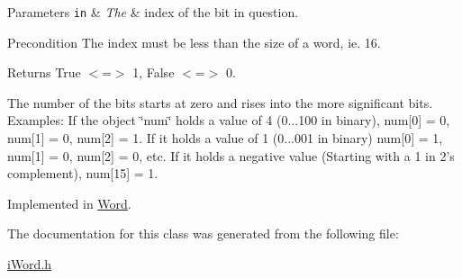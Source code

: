 \begin{DoxyParams}[1]{Parameters}
\mbox{\tt in}  & {\em The} & index of the bit in question. \\
\hline
\end{DoxyParams}
\begin{DoxyPrecond}{Precondition}
The index must be less than the size of a word, ie. 16. 
\end{DoxyPrecond}
\begin{DoxyReturn}{Returns}
True $<$=$>$ 1, False $<$=$>$ 0.
\end{DoxyReturn}
The number of the bits starts at zero and rises into the more significant bits. Examples: If the object \char`\"{}num\char`\"{} holds a value of 4 (0...100 in binary), num\mbox{[}0\mbox{]} = 0, num\mbox{[}1\mbox{]} = 0, num\mbox{[}2\mbox{]} = 1. If it holds a value of 1 (0...001 in binary) num\mbox{[}0\mbox{]} = 1, num\mbox{[}1\mbox{]} = 0, num\mbox{[}2\mbox{]} = 0, etc. If it holds a negative value (Starting with a 1 in 2's complement), num\mbox{[}15\mbox{]} = 1. 

Implemented in \hyperlink{classWord_ab0f10ac1a0397559b859774b503538fe}{Word}.



The documentation for this class was generated from the following file:\begin{DoxyCompactItemize}
\item 
\hyperlink{iWord_8h}{iWord.h}\end{DoxyCompactItemize}
